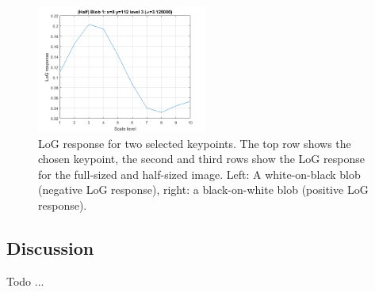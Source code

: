 \begin{figure}[h]
	\includegraphics[width=0.5\textwidth]{figures/a3_butterfly_log_half_2.png}
	\caption{LoG response for two selected keypoints. The top row shows the chosen keypoint, the second and third rows show the LoG response for the full-sized and half-sized image. Left: A white-on-black blob (negative LoG response), right: a black-on-white blob (positive LoG response).}
	\label{fig:a3:logresponse}
\end{figure}

\subsection{Discussion}

Todo ...

